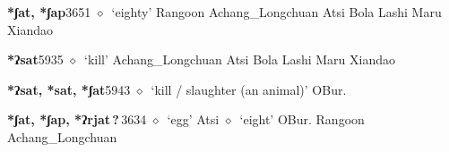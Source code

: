   \begin{list}{}{\leftmargin=1.5em \itemindent=-1.5em}
  \item {\footnotesize \textbf{*ʃat, *ʃap}}{\tiny 3651}
         $\diamond$~`eighty'
         Rangoon 
\hspace{1ex}
         Achang\_Longchuan 
\hspace{1ex}
         Atsi 
\hspace{1ex}
         Bola 
\hspace{1ex}
         Lashi 
\hspace{1ex}
         Maru 
\hspace{1ex}
         Xiandao 
  \item {\footnotesize \textbf{*ʔsat}}{\tiny 5935}
\hspace{1ex}
         $\diamond$~`kill'
         Achang\_Longchuan 
\hspace{1ex}
         Atsi 
\hspace{1ex}
         Bola 
\hspace{1ex}
         Lashi 
\hspace{1ex}
         Maru 
\hspace{1ex}
         Xiandao 
  \item {\footnotesize \textbf{*ʔsat, *sat, *ʃat}}{\tiny 5943}
\hspace{1ex}
         $\diamond$~`kill / slaughter (an animal)'
         OBur. 
  \item {\footnotesize \textbf{*ʃat, *ʃap, *ʔrjat\,?\,}}{\tiny 3634}
\hspace{1ex}
         $\diamond$~`egg'
         Atsi 
\hspace{1ex}
         $\diamond$~`eight'
         OBur. 
\hspace{1ex}
         Rangoon 
\hspace{1ex}
         Achang\_Longchuan 

\end{list}
